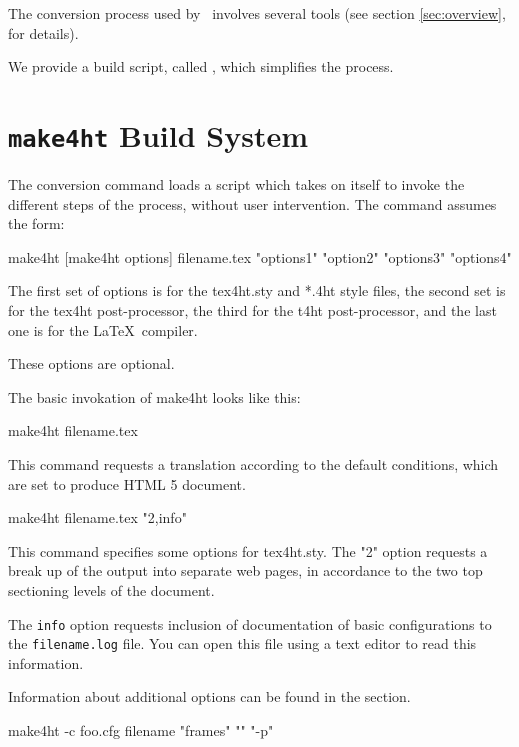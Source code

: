 The conversion process used by \texfourht\ involves several tools
(see section \ref{sec:overview},  for details). 


We provide a build script, called , which simplifies the 
process.


\section{\texttt{make4ht} Build System}
\label{sec:make4ht-intro}

The conversion command loads a script which takes on itself to invoke the
different steps of the process, without user intervention. The command assumes
the form:

\begin{shellcommand}
make4ht [make4ht options] filename.tex "options1" "option2" "options3" "options4"
\end{shellcommand}

The first set of options is for the tex4ht.sty and *.4ht style files, the
second set is for the tex4ht post-processor, the third for the t4ht
post-processor, and the last one is for the \LaTeX\ compiler. 

These options are optional.

The basic invokation of make4ht looks like this:

\begin{shellcommand}
make4ht filename.tex
\end{shellcommand}

This command requests a translation according to the default conditions, which are set to produce HTML 5 document.

\begin{shellcommand}
make4ht filename.tex "2,info"
\end{shellcommand}

This command specifies some options for tex4ht.sty. The "2" option requests a
break up of the output into separate web pages, in accordance to the two top
sectioning levels of the document.

The \texttt{info} option requests inclusion of documentation of basic configurations to the \texttt{filename.log} file.
You can open this file using a text editor to read this information.

Information about additional options can be found in the  section.



\begin{shellcommand}
make4ht -c foo.cfg filename "frames" "" "-p"
\end{shellcommand}

